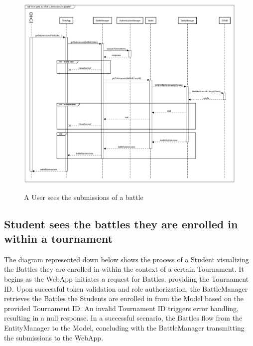 \documentclass{Configuration_Files/Template}
\begin{document}
\begin{figure}[H]
\centering
\includegraphics[scale = 0.33]{Images/diagrams/sequences/getBattleSubmissions.png}\\
\caption{A User sees the submissions of a battle}
\end{figure}

\subsection{Student sees the battles they are enrolled in within a tournament}

The diagram represented down below shows the process of a Student visualizing the Battles they are enrolled in within the context of a certain Tournament. It begins as the WebApp initiates a request for Battles, providing the Tournament ID. Upon successful token validation and role authorization, the BattleManager retrieves the Battles the Students are enrolled in from the Model based on the provided Tournament ID. An invalid Tournament ID triggers error handling, resulting in a null response. In a successful scenario, the Battles flow from the EntityManager to the Model, concluding with the BattleManager transmitting the submissions to the WebApp.
\end{document}
